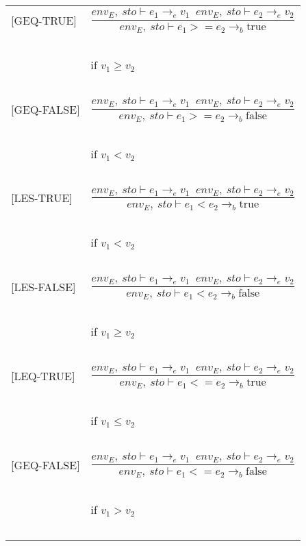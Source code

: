 \begin{longtable}{l l}
[GEQ-TRUE] & \[\frac{env_E, \: sto \vdash e_1 \rightarrow_e v_1 \;\; env_E, \: sto \vdash e_2 \rightarrow_e v_2}{env_E, \: sto \vdash e_1 >= e_2  \rightarrow_b \text{true}}\] \\
~ & ~ \\
~ & \indent\indent if $v_1 \geq v_2$ \\
~ & ~ \\

[GEQ-FALSE] & \[\frac{env_E, \: sto \vdash e_1 \rightarrow_e v_1 \;\; env_E, \: sto \vdash e_2 \rightarrow_e v_2}{env_E, \: sto \vdash e_1 >= e_2  \rightarrow_b \text{false}}\] \\
~ & ~ \\
~ & \indent\indent if $v_1 < v_2$ \\
~ & ~ \\

[LES-TRUE] & \[\frac{env_E, \: sto \vdash e_1 \rightarrow_e v_1 \;\; env_E, \: sto \vdash e_2 \rightarrow_e v_2}{env_E, \: sto \vdash e_1 < e_2  \rightarrow_b \text{true}}\] \\
~ & ~ \\
~ & \indent\indent if $v_1 < v_2$ \\
~ & ~ \\

[LES-FALSE] & \[\frac{env_E, \: sto \vdash e_1 \rightarrow_e v_1 \;\; env_E, \: sto \vdash e_2 \rightarrow_e v_2}{env_E, \: sto \vdash e_1 < e_2  \rightarrow_b \text{false}}\] \\
~ & ~ \\
~ & \indent\indent if $v_1 \geq v_2$ \\
~ & ~ \\

[LEQ-TRUE] & \[\frac{env_E, \: sto \vdash e_1 \rightarrow_e v_1 \;\; env_E, \: sto \vdash e_2 \rightarrow_e v_2}{env_E, \: sto \vdash e_1 <= e_2  \rightarrow_b \text{true}}\] \\
~ & ~ \\
~ & \indent\indent if $v_1 \leq v_2$ \\
~ & ~ \\

[GEQ-FALSE] & \[\frac{env_E, \: sto \vdash e_1 \rightarrow_e v_1 \;\; env_E, \: sto \vdash e_2 \rightarrow_e v_2}{env_E, \: sto \vdash e_1 <= e_2  \rightarrow_b \text{false}}\] \\
~ & ~ \\
~ & \indent\indent if $v_1 > v_2$ \\
~ & ~ \\


\end{longtable}
